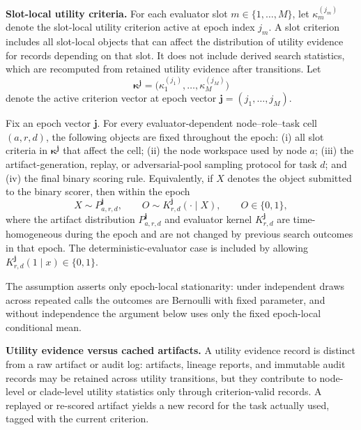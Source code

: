 \noindent\textbf{Slot-local utility criteria.}
For each evaluator slot \(m\in\{1,\ldots,M\}\), let
\(\kappa_m^{(j_m)}\) denote the slot-local utility criterion active at epoch index \(j_m\).
A slot criterion includes all slot-local objects that can affect the distribution of utility evidence
for records depending on that slot. It does
not include derived search statistics, which are recomputed from retained utility evidence after
transitions. Let
\[
\boldsymbol{\kappa}^{\boldsymbol{j}}
=
\bigl(\kappa_1^{(j_1)},\ldots,\kappa_M^{(j_M)}\bigr)
\]
denote the active criterion vector at epoch vector \(\boldsymbol{j}=(j_1,\ldots,j_M)\).

\begin{assumption}
\label{assumption:generative}
Fix an epoch vector \(\boldsymbol{j}\). For every evaluator-dependent node--role--task cell
\((a,r,d)\), the following objects are fixed throughout the epoch:
(i) all slot criteria in \(\boldsymbol{\kappa}^{\boldsymbol{j}}\) that affect the cell;
(ii) the node workspace used by node \(a\);
(iii) the artifact-generation, replay, or adversarial-pool sampling protocol for task \(d\); and
(iv) the final binary scoring rule.
Equivalently, if \(X\) denotes the object submitted to the binary scorer, then within the epoch
\[
X\sim P_{a,r,d}^{\boldsymbol{j}},
\qquad
O\sim K_{r,d}^{\boldsymbol{j}}(\cdot\mid X),
\qquad
O\in\{0,1\},
\]
where the artifact distribution \(P_{a,r,d}^{\boldsymbol{j}}\) and evaluator kernel
\(K_{r,d}^{\boldsymbol{j}}\) are time-homogeneous during the epoch and are not changed by previous
search outcomes in that epoch. The deterministic-evaluator case is included by allowing
\(K_{r,d}^{\boldsymbol{j}}(1\mid x)\in\{0,1\}\).
\end{assumption}

The assumption asserts only epoch-local stationarity: under independent draws across repeated calls
the outcomes are Bernoulli with fixed parameter, and without independence the argument below uses
only the fixed epoch-local conditional mean.

\noindent\textbf{Utility evidence versus cached artifacts.}
A utility evidence record is distinct from a raw artifact or audit log: artifacts, lineage reports,
and immutable audit records may be retained across utility transitions, but they contribute to
node-level or clade-level utility statistics only through criterion-valid records. A replayed or
re-scored artifact yields a new record for the task actually used, tagged with the current
criterion.

